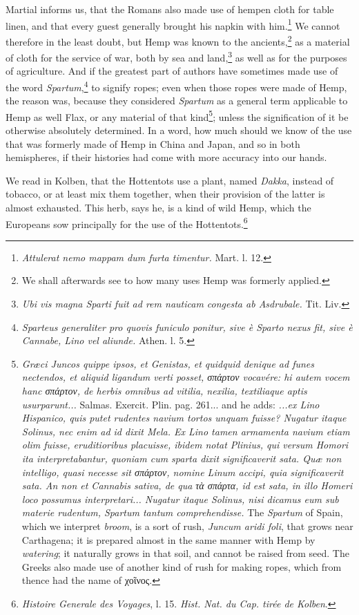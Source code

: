 \documentclass[a4paper, 11pt, oneside, polutonikogreek, english]{article}
\begin{document}
Martial informs us, that the Romans also made use of hempen cloth for table linen, and that every guest generally brought his napkin with him.\footnote{\emph{Attulerat nemo mappam dum furta timentur.} Mart. l. 12.} We cannot therefore in the least doubt, but Hemp was known to the ancients,\footnote{We shall afterwards see to how many uses Hemp was formerly applied.} as a material of cloth for the service of war, both by sea and land,\footnote{\emph{Ubi vis magna Sparti fuit ad rem nauticam congesta ab Asdrubale.} Tit. Liv.} as well as for the purposes of agriculture. And if the greatest part of authors have sometimes made use of the word \emph{Spartum},\footnote{\emph{Sparteus generaliter pro quovis funiculo ponitur, sive è Sparto nexus fit, sive è Cannabe, Lino vel aliunde.} Athen. l. 5.} to signify ropes; even when those ropes were made of Hemp, the reason was, because they considered \emph{Spartum} as a general term applicable to Hemp as well Flax, or any material of that kind\footnote{\emph{Græci Juncos quippe ipsos, et Genistas, et quidquid denique ad funes nectendos, et aliquid ligandum verti posset, σπάρτον vocavére: hi autem vocem hanc σπάρτον, de herbis omnibus ad vitilia, nexilia, textiliaque aptis usurparunt...} Salmas. Exercit. Plin. pag. 261... and he adds: \emph{...ex Lino Hispanico, quis putet rudentes navium tortos unquam fuisse? Nugatur itaque Solinus, nec enim ad id dixit Mela. Ex Lino tamen armamenta navium etiam olim fuisse, eruditioribus placuisse, ibidem notat Plinius, qui versum Homori ita interpretabantur, quoniam cum sparta dixit significaverit sata. Quæ non intelligo, quasi necesse sit σπάρτον, nomine Linum accipi, quia significaverit sata. An non et Cannabis sativa, de qua τὰ σπάρτα, id est sata, in illo Homeri loco possumus interpretari... Nugatur itaque Solinus, nisi dicamus eum sub materie rudentum, Spartum tantum comprehendisse.}  The \emph{Spartum} of Spain, which we interpret \emph{broom}, is a sort of rush, \emph{Juncum aridi foli}, that grows near Carthagena; it is prepared almost in the same manner with Hemp by \emph{watering}; it naturally grows in that soil, and cannot be raised from seed.  
The Greeks also made use of another kind of rush for making ropes, which from thence had the name of χοῖνος.}; unless the signification of it be otherwise absolutely determined. In a word, how much should we know of the use that was formerly made of Hemp in China and Japan, and so in both hemispheres, if their histories had come with more accuracy into our hands.

We read in Kolben, that the Hottentots use a plant, named \emph{Dakka}, instead of tobacco, or at least mix them together, when their provision of the latter is almost exhausted. This herb, says he, is a kind of wild Hemp, which the Europeans sow principally for the use of the Hottentots.\footnote{\emph{Histoire Generale des Voyages}, l. 15. \emph{Hist. Nat. du Cap. tirée de Kolben}.}
\end{document}
